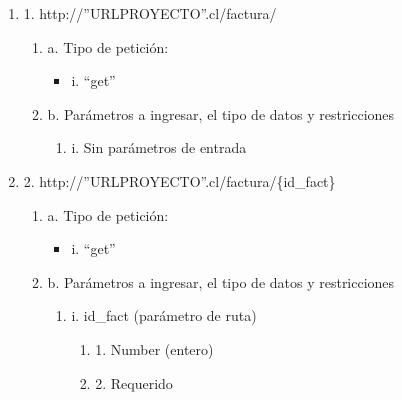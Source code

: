 \begin{enumerate}
    \item 1. http://”URLPROYECTO”.cl/factura/
    \begin{enumerate}
        \item a. Tipo de petición:
            \begin{itemize}
               \item i. “get”
            \end{itemize}
        \item b. Parámetros a ingresar, el tipo de datos y restricciones
            \begin{enumerate}
                \item i. Sin parámetros de entrada
            \end{enumerate}
    \end{enumerate}

    \item 2. http://”URLPROYECTO”.cl/factura/\{id\_fact\}
    \begin{enumerate}
        \item a. Tipo de petición:
            \begin{itemize}
               \item i. “get”
            \end{itemize}
        \item b. Parámetros a ingresar, el tipo de datos y restricciones
            \begin{enumerate}
                \item i. id\_fact (parámetro de ruta)
                    \begin{enumerate}
                        \item 1. Number (entero)
                        \item 2. Requerido
                    \end{enumerate}
            \end{enumerate}
    \end{enumerate}


\end{enumerate}

